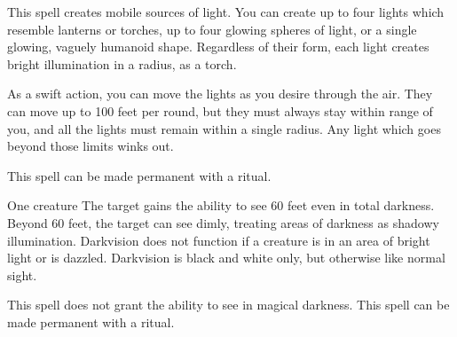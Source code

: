 \begin{spellheader}
    \spelldur{\durshort \dismissable}
\end{spellheader}
\begin{spelleffects}
    \spelleffect This spell creates mobile sources of light. You can create up to four lights which resemble lanterns or torches, up to four glowing spheres of light, or a single glowing, vaguely humanoid shape. Regardless of their form, each light creates bright illumination in a \areamed radius, as a torch.

    As a swift action, you can move the lights as you desire through the air. They can move up to 100 feet per round, but they must always stay within range of you, and all the lights must remain within a single \areamed radius. Any light which goes beyond those limits winks out.
\end{spelleffects}
\begin{spellfooter}
    \spellnotes This spell can be made permanent with a  ritual.
\end{spellfooter}

\begin{spellheader}
    \spellrng{\rngtouch}
    \spelldur{\durlong}
\end{spellheader}
\begin{spelleffects}
    \begin{spelltarget}{One creature}
        \spelleffect The target gains the ability to see 60 feet even in total darkness. Beyond 60 feet, the target can see dimly, treating areas of darkness as shadowy illumination. Darkvision does not function if a creature is in an area of bright light or is dazzled. Darkvision is black and white only, but otherwise like normal sight.
    \end{spelltarget}
\end{spelleffects}
\begin{spellfooter}
    \spellnotes This spell does not grant the ability to see in magical darkness. This spell can be made permanent with a  ritual.
\end{spellfooter}

